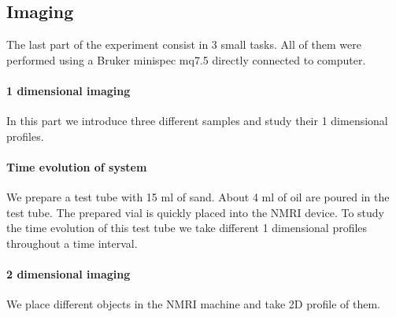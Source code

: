 \subsection{Imaging}
The last part of the experiment consist in 3 small tasks. All of them were performed using a Bruker minispec mq7.5 directly connected to  computer.
\paragraph{1 dimensional imaging}
In this part we introduce three different samples and study their 1 dimensional profiles. 
\paragraph{Time evolution of system}
We prepare a test tube with 15 ml of sand. About 4 ml of oil are poured in the test tube. The prepared vial is quickly placed into the NMRI device. To study the time evolution of this test tube we take different  1 dimensional profiles throughout a time interval. 
\paragraph{2 dimensional imaging}
We place different objects in the NMRI machine and take 2D profile of them. 

